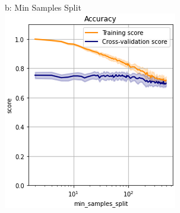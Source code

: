\documentclass{article}
\begin{document}
\begin{figure}
\begin{subfigure}{.24\textwidth}
	\end{subfigure}%
	\begin{subfigure}{.24\textwidth}
		b: Min Samples Split
		\centering
		\includegraphics[width=\linewidth]{poland_decision_min_samples_split.png}
		

\end{subfigure}
\end{figure}
\end{document}
